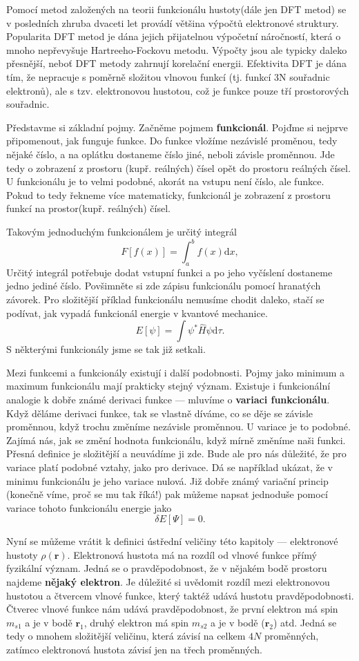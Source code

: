 Pomocí metod založených na teorii funkcionálu hustoty(dále jen DFT metod) se v posledních zhruba dvaceti let provádí většina výpočtů elektronové struktury. Popularita DFT metod je dána jejich přijatelnou výpočetní náročností, která o mnoho nepřevyšuje Hartreeho-Fockovu 
metodu. Výpočty jsou ale typicky daleko přesnější, neboť DFT metody zahrnují korelační energii. Efektivita DFT je dána tím, že nepracuje s poměrně složitou vlnovou funkcí (tj. funkcí 3N souřadnic elektronů), ale s tzv. elektronovou hustotou, což je funkce pouze tří prostorových souřadnic. 

Představme si základní pojmy. Začněme pojmem \textbf{funkcionál}. Pojďme si nejprve připomenout, jak funguje funkce. Do funkce vložíme nezávislé proměnou, tedy nějaké číslo, a na oplátku dostaneme číslo jiné, neboli závisle proměnnou. Jde tedy o zobrazení z prostoru (kupř. reálných) čísel opět do prostoru reálných čísel. U funkcionálu je to velmi podobné, akorát na vstupu není číslo, ale funkce. Pokud to tedy řekneme více matematicky, funkcionál je zobrazení z prostoru funkcí na prostor(kupř. reálných) čísel.

Takovým jednoduchým funkcionálem je určitý integrál
$$
F[f(x)] = \int_a^b f(x) \mathrm{d}x, 
$$
Určitý integrál potřebuje dodat vstupní funkci a po jeho vyčíslení dostaneme jedno jediné číslo. Povšimněte si zde zápisu funkcionálu pomocí hranatých závorek.  
Pro složitější příklad funkcionálu nemusíme chodit daleko, stačí se podívat, jak vypadá funkcionál energie v kvantové mechanice.
$$
E[\psi] = \int \psi^*\hat{H}\psi \mathrm{d}\tau .
$$
S některými funkcionály jsme se tak již setkali.

Mezi funkcemi a funkcionály existují i další podobnosti. Pojmy jako minimum a maximum funkcionálu mají prakticky stejný význam. Existuje i funkcionální analogie k dobře známé derivaci funkce --- mluvíme o \textbf{variaci funkcionálu}.
Když děláme derivaci funkce, tak se vlastně díváme, co se děje se závisle proměnnou, když trochu změníme nezávisle proměnnou.
U variace je to podobné. Zajímá nás, jak se změní hodnota funkcionálu, když mírně změníme naši funkci. Přesná definice je složitější a neuvádíme ji zde. Bude ale pro nás důležité, že pro variace platí podobné vztahy, jako pro derivace. Dá se například ukázat, že v minimu funkcionálu je jeho variace nulová. Již dobře známý variační princip (konečně víme, proč se mu tak říká!) pak můžeme napsat jednoduše pomocí variace tohoto funkcionálu energie jako
$$
\delta E[\Psi] = 0 .
$$

Nyní se můžeme vrátit k definici ústřední veličiny této kapitoly --- elektronové hustoty $\rho(\mathbf{r})$.
Elektronová hustota má na rozdíl od vlnové funkce přímý fyzikální význam. Jedná se o pravděpodobnost, že v nějakém bodě prostoru najdeme \textbf{nějaký elektron}. Je důležité si uvědomit rozdíl mezi elektronovou hustotou a čtvercem vlnové funkce, který taktéž udává hustotu pravděpodobnosti. Čtverec vlnové funkce nám udává pravděpodobnost, že první elektron má spin $m_{s1}$ a je v bodě $\mathbf{r}_1$, druhý elektron má spin $m_{s2}$ a je v bodě ($\mathbf{r}_2$) atd. Jedná se tedy o mnohem složitější veličinu, která závisí na celkem $4N$ proměnných, zatímco elektronová hustota závisí jen na třech proměnných.

